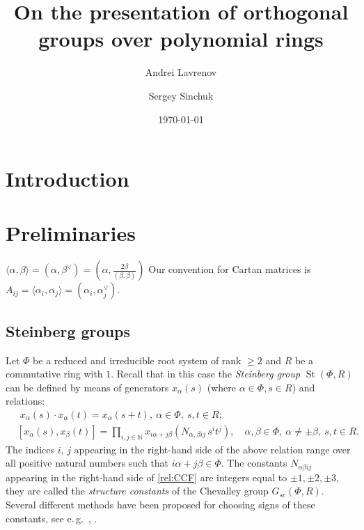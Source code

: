 \documentclass[oneside, 8pt]{amsart}
\title{On the presentation of orthogonal groups over polynomial rings}
\author{Andrei Lavrenov}
\author {Sergey Sinchuk}
\date {\today}
\theoremstyle{remark}
\theoremstyle{definition}
\DeclareMathOperator{\St}{St}
\numberwithin{equation}{section}
\begin{document}
\maketitle
\section{Introduction}


\section{Preliminaries}
$\langle \alpha, \beta \rangle = (\alpha, \beta^\vee) = (\alpha, \frac{2\beta}{(\beta, \beta)})$
Our convention for Cartan matrices is 
$A_{ij} = \langle \alpha_i, \alpha_j \rangle = (\alpha_i, \alpha_j^\vee)$.

\subsection{Steinberg groups}
Let $\Phi$ be a reduced and irreducible root system of rank $\geq 2$ and $R$ be a commutative ring with $1$. Recall that in this case the \emph{Steinberg group} $\St(\Phi, R)$ can be defined by means of generators $x_{\alpha}(s)$ (where $\alpha\in\Phi, s\in R$) and relations:
\begin{align}
& \phantom{[}
x_\alpha(s) \cdot x_\alpha(t) = x_\alpha(s+t),\ \alpha\in\Phi,\ s,t\in R; \label{rel:add}\\
& [x_\alpha(s), x_\beta(t)] = \prod\limits_{i,j\in\mathbb{N}}
 x_{i\alpha + j\beta}\left(N_{\alpha,\beta ij}\, s^i t^j\right),\quad \alpha,\beta\in\Phi,\ \alpha\neq\pm\beta,\ s,t\in R. \label{rel:CCF}
\end{align}
The indices $i$, $j$ appearing in the right-hand side of the above relation range over
all positive natural numbers such that $i\alpha + j\beta\in\Phi$.
The constants $N_{\alpha \beta i j}$ appearing in the right-hand side of \eqref{rel:CCF} are integers equal to $\pm 1,\pm 2,\pm 3$, they are called the {\it structure constants} of the Chevalley group $G_{sc}(\Phi, R)$. Several different methods have been proposed for choosing signs of these constants, see e.\,g.~\cite{V00}, \cite[\S~9]{VP}.
\end{document}
